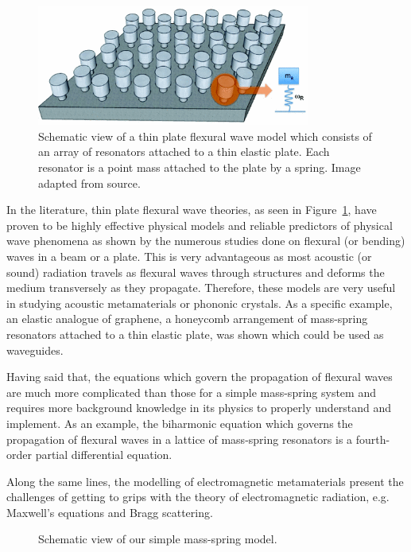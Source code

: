 \begin{figure}[!h]
\centering
\includegraphics[width=0.8\textwidth]{imgs/flexplate.png}
\caption{\label{fig:flexplate} Schematic view of a thin plate flexural wave
         model which consists of an array of resonators attached to a thin
         elastic plate. Each resonator is a point mass attached to the plate by
         a spring. Image adapted from source.\cite{graphene}}
\end{figure}

In the literature, thin plate flexural wave theories,\cite{graff,toelastic} as
seen in Figure~\ref{fig:flexplate}, have proven to be highly effective physical
models and reliable predictors of physical wave phenomena as shown by the
numerous studies done on flexural (or bending) waves in a beam or a
plate.\cite{flexbeam,graphene,mehulgeom} This is very advantageous as most
acoustic (or sound) radiation travels as flexural waves through structures and
deforms the medium transversely as they propagate.\cite{sound} Therefore, these
models are very useful in studying acoustic metamaterials or phononic
crystals.\cite{phonon} As a specific example, an elastic analogue of graphene,
a honeycomb arrangement of mass-spring resonators attached to a thin elastic
plate, was shown which could be used as waveguides.\cite{graphene}

Having said that, the equations which govern the propagation of flexural waves
are much more complicated than those for a simple mass-spring system and
requires more background knowledge in its physics to properly understand and
implement. As an example, the biharmonic equation which governs the propagation
of flexural waves in a lattice of mass-spring resonators is a fourth-order
partial differential equation.

Along the same lines, the modelling of electromagnetic metamaterials present
the challenges of getting to grips with the theory of electromagnetic
radiation, e.g. Maxwell's equations\cite{maxwell} and Bragg
scattering\cite{bragg}.

\begin{figure}[!h]
\centering
  \caption{\label{fig:ourmodel} Schematic view of our simple mass-spring model.}
\end{figure}

